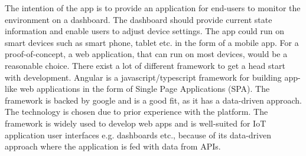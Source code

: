 The intention of the app is to provide an application for end-users to monitor the environment on a dashboard. The dashboard should provide current state information and enable users to adjust device settings. The app could run on smart devices such as smart phone, tablet etc. in the form of a mobile app. For a proof-of-concept, a web application, that can run on most devices, would be a reasonable choice. There exist a lot of different framework to get a head start with development.  Angular is a javascript/typescript framework for building app-like web applications in the form of Single Page Applications (SPA). The framework is backed by google and is a good fit, as it has a data-driven approach. The technology is chosen due to prior experience with the platform. The framework is widely used to develop web apps and is well-suited for IoT application user interfaces e.g. dashboards etc., because of its data-driven approach where the application is fed with data from APIs.